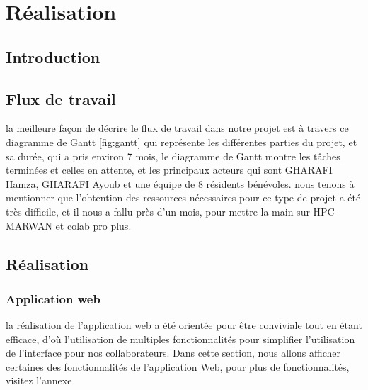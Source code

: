 \chapter{Réalisation}

\section*{Introduction}

\section{Flux de travail}
la meilleure façon de décrire le flux de travail dans notre projet est à travers ce diagramme de Gantt \ref{fig:gantt} qui représente les différentes parties du projet, et sa durée, qui a pris environ 7 mois, le diagramme de Gantt montre les tâches terminées et celles en attente, et les principaux acteurs qui sont GHARAFI Hamza, GHARAFI Ayoub et une équipe de 8 résidents bénévoles.
nous tenons à mentionner que l'obtention des ressources nécessaires pour ce type de projet a été très difficile, et il nous a fallu près d'un mois, pour mettre la main sur HPC-MARWAN et colab pro plus.
\section{Réalisation}
\subsection{Application web}
la réalisation de l'application web a été orientée pour être conviviale tout en étant efficace, d'où l'utilisation de multiples fonctionnalités pour simplifier l'utilisation de l'interface pour nos collaborateurs.
Dans cette section, nous allons afficher certaines des fonctionnalités de l'application Web, pour plus de fonctionnalités, visitez l'annexe

